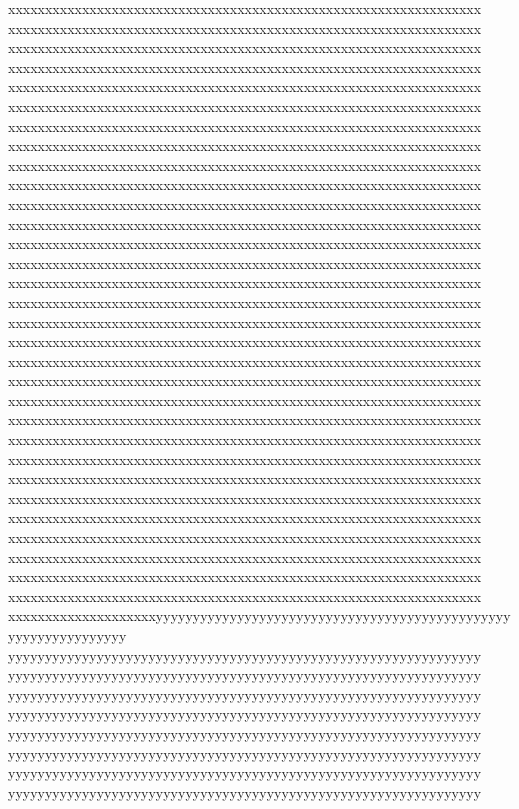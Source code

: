 {{xxxxxxxxxxxxxxxxxxxxxxxxxxxxxxxxxxxxxxxxxxxxxxxxxxxxxxxxxxxxxxxx%
xxxxxxxxxxxxxxxxxxxxxxxxxxxxxxxxxxxxxxxxxxxxxxxxxxxxxxxxxxxxxxxx%
xxxxxxxxxxxxxxxxxxxxxxxxxxxxxxxxxxxxxxxxxxxxxxxxxxxxxxxxxxxxxxxx%
xxxxxxxxxxxxxxxxxxxxxxxxxxxxxxxxxxxxxxxxxxxxxxxxxxxxxxxxxxxxxxxx%
xxxxxxxxxxxxxxxxxxxxxxxxxxxxxxxxxxxxxxxxxxxxxxxxxxxxxxxxxxxxxxxx%
xxxxxxxxxxxxxxxxxxxxxxxxxxxxxxxxxxxxxxxxxxxxxxxxxxxxxxxxxxxxxxxx%
xxxxxxxxxxxxxxxxxxxxxxxxxxxxxxxxxxxxxxxxxxxxxxxxxxxxxxxxxxxxxxxx%
xxxxxxxxxxxxxxxxxxxxxxxxxxxxxxxxxxxxxxxxxxxxxxxxxxxxxxxxxxxxxxxx%
xxxxxxxxxxxxxxxxxxxxxxxxxxxxxxxxxxxxxxxxxxxxxxxxxxxxxxxxxxxxxxxx%
xxxxxxxxxxxxxxxxxxxxxxxxxxxxxxxxxxxxxxxxxxxxxxxxxxxxxxxxxxxxxxxx%
xxxxxxxxxxxxxxxxxxxxxxxxxxxxxxxxxxxxxxxxxxxxxxxxxxxxxxxxxxxxxxxx%
xxxxxxxxxxxxxxxxxxxxxxxxxxxxxxxxxxxxxxxxxxxxxxxxxxxxxxxxxxxxxxxx%
xxxxxxxxxxxxxxxxxxxxxxxxxxxxxxxxxxxxxxxxxxxxxxxxxxxxxxxxxxxxxxxx%
xxxxxxxxxxxxxxxxxxxxxxxxxxxxxxxxxxxxxxxxxxxxxxxxxxxxxxxxxxxxxxxx%
xxxxxxxxxxxxxxxxxxxxxxxxxxxxxxxxxxxxxxxxxxxxxxxxxxxxxxxxxxxxxxxx%
xxxxxxxxxxxxxxxxxxxxxxxxxxxxxxxxxxxxxxxxxxxxxxxxxxxxxxxxxxxxxxxx%
xxxxxxxxxxxxxxxxxxxxxxxxxxxxxxxxxxxxxxxxxxxxxxxxxxxxxxxxxxxxxxxx%
xxxxxxxxxxxxxxxxxxxxxxxxxxxxxxxxxxxxxxxxxxxxxxxxxxxxxxxxxxxxxxxx%
xxxxxxxxxxxxxxxxxxxxxxxxxxxxxxxxxxxxxxxxxxxxxxxxxxxxxxxxxxxxxxxx%
xxxxxxxxxxxxxxxxxxxxxxxxxxxxxxxxxxxxxxxxxxxxxxxxxxxxxxxxxxxxxxxx%
xxxxxxxxxxxxxxxxxxxxxxxxxxxxxxxxxxxxxxxxxxxxxxxxxxxxxxxxxxxxxxxx%
xxxxxxxxxxxxxxxxxxxxxxxxxxxxxxxxxxxxxxxxxxxxxxxxxxxxxxxxxxxxxxxx%
xxxxxxxxxxxxxxxxxxxxxxxxxxxxxxxxxxxxxxxxxxxxxxxxxxxxxxxxxxxxxxxx%
xxxxxxxxxxxxxxxxxxxxxxxxxxxxxxxxxxxxxxxxxxxxxxxxxxxxxxxxxxxxxxxx%
xxxxxxxxxxxxxxxxxxxxxxxxxxxxxxxxxxxxxxxxxxxxxxxxxxxxxxxxxxxxxxxx%
xxxxxxxxxxxxxxxxxxxxxxxxxxxxxxxxxxxxxxxxxxxxxxxxxxxxxxxxxxxxxxxx%
xxxxxxxxxxxxxxxxxxxxxxxxxxxxxxxxxxxxxxxxxxxxxxxxxxxxxxxxxxxxxxxx%
xxxxxxxxxxxxxxxxxxxxxxxxxxxxxxxxxxxxxxxxxxxxxxxxxxxxxxxxxxxxxxxx%
xxxxxxxxxxxxxxxxxxxxxxxxxxxxxxxxxxxxxxxxxxxxxxxxxxxxxxxxxxxxxxxx%
xxxxxxxxxxxxxxxxxxxxxxxxxxxxxxxxxxxxxxxxxxxxxxxxxxxxxxxxxxxxxxxx%
xxxxxxxxxxxxxxxxxxxxxxxxxxxxxxxxxxxxxxxxxxxxxxxxxxxxxxxxxxxxxxxx%
xxxxxxxxxxxxxxxxxxxx}yyyyyyyyyyyyyyyyyyyyyyyyyyyyyyyyyyyyyyyyyyyyyyyyyyyyyyyyyyyyyyyy%
yyyyyyyyyyyyyyyyyyyyyyyyyyyyyyyyyyyyyyyyyyyyyyyyyyyyyyyyyyyyyyyy%
yyyyyyyyyyyyyyyyyyyyyyyyyyyyyyyyyyyyyyyyyyyyyyyyyyyyyyyyyyyyyyyy%
yyyyyyyyyyyyyyyyyyyyyyyyyyyyyyyyyyyyyyyyyyyyyyyyyyyyyyyyyyyyyyyy%
yyyyyyyyyyyyyyyyyyyyyyyyyyyyyyyyyyyyyyyyyyyyyyyyyyyyyyyyyyyyyyyy%
yyyyyyyyyyyyyyyyyyyyyyyyyyyyyyyyyyyyyyyyyyyyyyyyyyyyyyyyyyyyyyyy%
yyyyyyyyyyyyyyyyyyyyyyyyyyyyyyyyyyyyyyyyyyyyyyyyyyyyyyyyyyyyyyyy%
yyyyyyyyyyyyyyyyyyyyyyyyyyyyyyyyyyyyyyyyyyyyyyyyyyyyyyyyyyyyyyyy%
yyyyyyyyyyyyyyyyyyyyyyyyyyyyyyyyyyyyyyyyyyyyyyyyyyyyyyyyyyyyyyyy%
}
